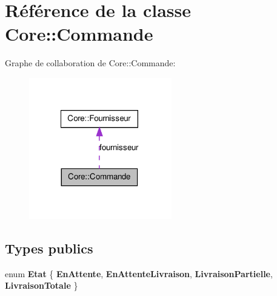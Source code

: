 \hypertarget{class_core_1_1_commande}{
\section{Référence de la classe Core::Commande}
\label{d0/d92/class_core_1_1_commande}
}


Graphe de collaboration de Core::Commande:\nopagebreak
\begin{figure}[H]
\begin{center}
\leavevmode
\includegraphics[width=176pt]{d4/da3/class_core_1_1_commande__coll__graph}
\end{center}
\end{figure}
\subsection*{Types publics}
\begin{DoxyCompactItemize}
\item 
enum {\bfseries Etat} \{ {\bfseries EnAttente}, 
{\bfseries EnAttenteLivraison}, 
{\bfseries LivraisonPartielle}, 
{\bfseries LivraisonTotale}
 \}
\end{DoxyCompactItemize}
